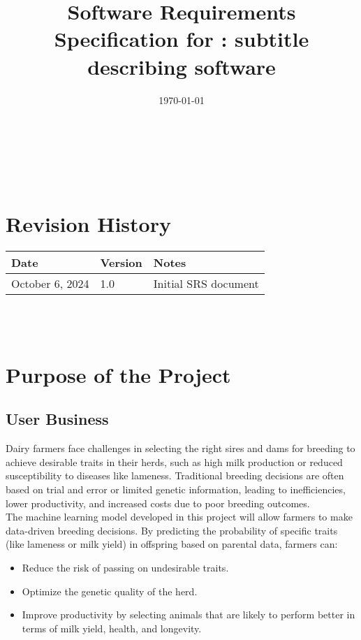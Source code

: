 \documentclass[12pt]{article}
\begin{document}
\title{Software Requirements Specification for \progname: subtitle describing software} 
\author{\authname}
\date{\today}
	
\maketitle

~\newpage


\tableofcontents

~\newpage

\section*{Revision History}

\begin{tabularx}{\textwidth}{p{3cm}p{2cm}X}
\toprule {\textbf{Date}} & {\textbf{Version}} & {\textbf{Notes}}\\
\midrule
October 6, 2024 & 1.0 & Initial SRS document\\
\bottomrule
\end{tabularx}

~\\

~\newpage
\section{Purpose of the Project}
\subsection{User Business}

Dairy farmers face challenges in selecting the right sires and dams for 
breeding to achieve desirable traits in their herds, such as high milk 
production or reduced susceptibility to diseases like lameness. Traditional 
breeding decisions are often based on trial and error or limited genetic 
information, leading to inefficiencies, lower productivity, and increased costs 
due to poor breeding outcomes. \\

The machine learning model developed in this project will allow farmers to make 
data-driven breeding decisions. By predicting the probability of specific 
traits (like lameness or milk yield) in offspring based on parental data, 
farmers can:
\begin{itemize}
    \item Reduce the risk of passing on undesirable traits.
    \item Optimize the genetic quality of the herd.
    \item Improve productivity by selecting animals that are likely to perform better in terms of milk yield, health, and longevity.
\end{itemize} 
\end{document}

